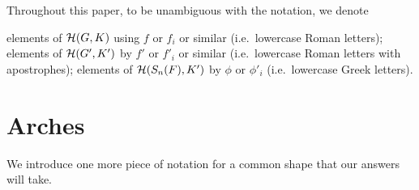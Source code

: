 Throughout this paper, to be unambiguous with the notation, we denote
\begin{itemize}
  \ii elements of $\mathcal H(G,K)$ using $f$ or $f_i$ or similar
    (i.e.\ lowercase Roman letters);
  \ii elements of $\mathcal H(G',K')$ by $f'$ or $f'_i$ or similar
    (i.e.\ lowercase Roman letters with apostrophes);
  \ii elements of $\mathcal H(S_n(F),K')$ by $\phi$ or $\phi'_i$
    (i.e.\ lowercase Greek letters).
\end{itemize}


\section{Arches}
We introduce one more piece of notation for a common shape that our answers will take.

